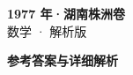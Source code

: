 \documentclass[zihao=-4, a4paper]{ctexart}
\begin{document}
\begin{center}
  {\Large\bfseries 1977 年·湖南株洲卷}\\[4pt]
  {\large 数学 · 解析版}
\end{center}
\medskip
{}

\clearpage
{}
\begin{center}{\Large\bfseries 参考答案与详细解析}\end{center}
\medskip

\end{document}
